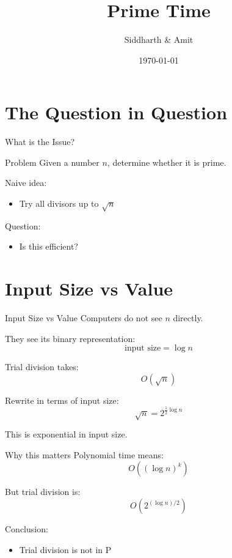 \documentclass{beamer}
\title{Prime Time}
\author{Siddharth \& Amit}
\date{\today}
\begin{document}
\maketitle

\section{The Question in Question}

\begin{frame}{What is the Issue?}
    \begin{block}{Problem}
        Given a number $n$, determine whether it is prime.
    \end{block}

    \pause

    Naive idea:
    \begin{itemize}
        \item Try all divisors up to $\sqrt{n}$
    \end{itemize}

    \pause

    Question:
    \begin{itemize}
        \item Is this efficient?
    \end{itemize}
\end{frame}

\section{Input Size vs Value}

\begin{frame}{Input Size vs Value}
Computers do not see $n$ directly.

\pause

They see its binary representation:
\[
\text{input size} = \log n
\]

\pause

Trial division takes:
\[
O(\sqrt{n})
\]

\pause

Rewrite in terms of input size:
\[
\sqrt{n} = 2^{\frac{1}{2} \log n}
\]

\pause

This is exponential in input size.
\end{frame}

\begin{frame}{Why this matters}
Polynomial time means:
\[
O((\log n)^k)
\]

\pause

But trial division is:
\[
O(2^{(\log n)/2})
\]

\pause

Conclusion:
\begin{itemize}
    \item Trial division is not in P
\end{itemize}
\end{frame}
\end{document}
